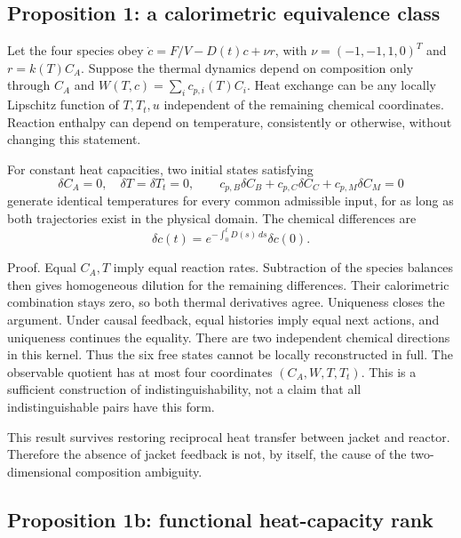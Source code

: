 \documentclass[
  11pt,
]{article}
\begin{document}
\hypertarget{proposition-1-a-calorimetric-equivalence-class}{%
\subsection{Proposition 1: a calorimetric equivalence
class}\label{proposition-1-a-calorimetric-equivalence-class}}

Let the four species obey \(\dot c=F/V-D(t)c+\nu r\), with
\(\nu=(-1,-1,1,0)^T\) and \(r=k(T)C_A\). Suppose the thermal dynamics
depend on composition only through \(C_A\) and
\(W(T,c)=\sum_i c_{p,i}(T)C_i\). Heat exchange can be any locally
Lipschitz function of \(T,T_t,u\) independent of the remaining chemical
coordinates. Reaction enthalpy can depend on temperature, consistently
or otherwise, without changing this statement.

For constant heat capacities, two initial states satisfying
\[\delta C_A=0,\quad\delta T=\delta T_t=0,\qquad
c_{p,B}\delta C_B+c_{p,C}\delta C_C+c_{p,M}\delta C_M=0\] generate
identical temperatures for every common admissible input, for as long as
both trajectories exist in the physical domain. The chemical differences
are \[\delta c(t)=e^{-\int_0^tD(s)\,ds}\delta c(0).\]

Proof. Equal \(C_A,T\) imply equal reaction rates. Subtraction of the
species balances then gives homogeneous dilution for the remaining
differences. Their calorimetric combination stays zero, so both thermal
derivatives agree. Uniqueness closes the argument. Under causal
feedback, equal histories imply equal next actions, and uniqueness
continues the equality. There are two independent chemical directions in
this kernel. Thus the six free states cannot be locally reconstructed in
full. The observable quotient has at most four coordinates
\((C_A,W,T,T_t)\). This is a sufficient construction of
indistinguishability, not a claim that all indistinguishable pairs have
this form.

This result survives restoring reciprocal heat transfer between jacket
and reactor. Therefore the absence of jacket feedback is not, by itself,
the cause of the two-dimensional composition ambiguity.

\hypertarget{proposition-1b-functional-heat-capacity-rank}{%
\subsection{Proposition 1b: functional heat-capacity
rank}\label{proposition-1b-functional-heat-capacity-rank}}
\end{document}
